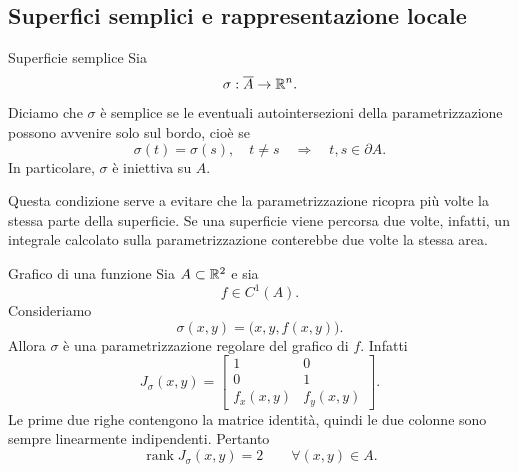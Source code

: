 \documentclass[a4paper]{article}
\begin{document}
\subsection{Superfici semplici e rappresentazione locale}

\begin{radioactive}
\begin{snippetdefinition}{Superficie semplice}
    Sia
    \[
        \sigma:\overline{A}\to\mathbb{R}^n.
    \]
    Diciamo che \(\sigma\) è semplice se le eventuali autointersezioni della parametrizzazione possono
    avvenire solo sul bordo, cioè se
    \[
        \sigma(t)=\sigma(s),\quad t\neq s
        \quad\Longrightarrow\quad
        t,s\in\partial A.
    \]
    In particolare, \(\sigma\) è iniettiva su \(A\).
\end{snippetdefinition}
\end{radioactive}

\begin{radioactive}
Questa condizione serve a evitare che la parametrizzazione ricopra più volte la stessa parte della
superficie. Se una superficie viene percorsa due volte, infatti, un integrale calcolato sulla
parametrizzazione conterebbe due volte la stessa area.
\end{radioactive}

\begin{radioactive}
\begin{snippetexample}{Grafico di una funzione}
    Sia \(A\subset\mathbb{R}^2\) e sia
    \[
        f\in C^1(A).
    \]
    Consideriamo
    \[
        \sigma(x,y)=\bigl(x,y,f(x,y)\bigr).
    \]
    Allora \(\sigma\) è una parametrizzazione regolare del grafico di \(f\). Infatti
    \[
        J_\sigma(x,y)
        =
        \begin{bmatrix}
            1 & 0\\
            0 & 1\\
            f_x(x,y) & f_y(x,y)
        \end{bmatrix}.
    \]
    Le prime due righe contengono la matrice identità, quindi le due colonne sono sempre linearmente
    indipendenti. Pertanto
    \[
        \operatorname{rank}J_\sigma(x,y)=2
        \qquad \forall (x,y)\in A.
    \]
\end{snippetexample}
\end{radioactive}
\end{document}
